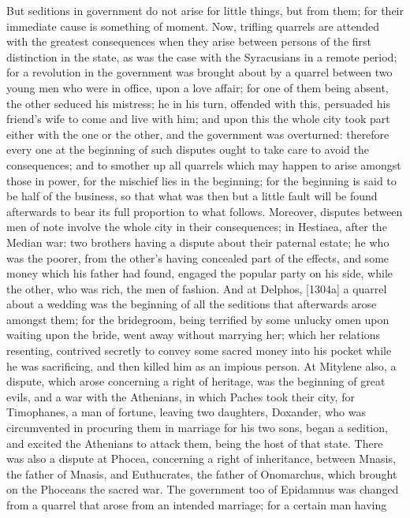 But seditions in government do not arise for little things, but from them;
for their immediate cause is something of moment. Now, trifling quarrels
are attended with the greatest consequences when they arise between
persons of the first distinction in the state, as was the case with the
Syracusians in a remote period; for a revolution in the government was
brought about by a quarrel between two young men who were in office, upon
a love affair; for one of them being absent, the other seduced his
mistress; he in his turn, offended with this, persuaded his friend's wife
to come and live with him; and upon this the whole city took part either
with the one or the other, and the government was overturned: therefore
every one at the beginning of such disputes ought to take care to avoid
the consequences; and to smother up all quarrels which may happen to arise
amongst those in power, for the mischief lies in the beginning; for the
beginning is said to be half of the business, so that what was then but a
little fault will be found afterwards to bear its full proportion to what
follows. Moreover, disputes between men of note involve the whole city in
their consequences; in Hestiaea, after the Median war: two brothers having
a dispute about their paternal estate; he who was the poorer, from the
other's having concealed part of the effects, and some money which his
father had found, engaged the popular party on his side, while the other,
who was rich, the men of fashion. And at Delphos, [1304a] a quarrel about
a wedding was the beginning of all the seditions that afterwards arose
amongst them; for the bridegroom, being terrified by some unlucky omen
upon waiting upon the bride, went away without marrying her; which her
relations resenting, contrived secretly to convey some sacred money into
his pocket while he was sacrificing, and then killed him as an impious
person. At Mitylene also, a dispute, which arose concerning a right of
heritage, was the beginning of great evils, and a war with the Athenians,
in which Paches took their city, for Timophanes, a man of fortune, leaving
two daughters, Doxander, who was circumvented in procuring them in
marriage for his two sons, began a sedition, and excited the Athenians to
attack them, being the host of that state. There was also a dispute at
Phocea, concerning a right of inheritance, between Mnasis, the father of
Mnasis, and Euthucrates, the father of Onomarchus, which brought on the
Phoceans the sacred war. The government too of Epidamnus was changed from
a quarrel that arose from an intended marriage; for a certain man having
